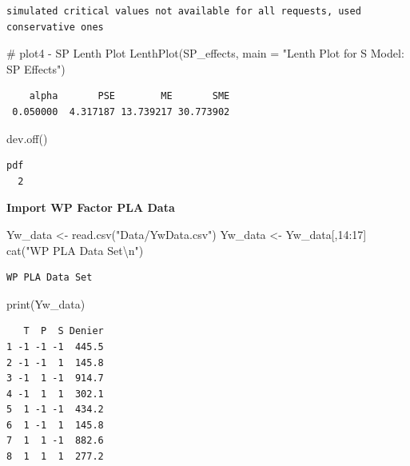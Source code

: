 \documentclass[
  letterpaper,
  DIV=11,
  numbers=noendperiod]{scrartcl}
\newenvironment{Shaded}{\begin{snugshade}}{\end{snugshade}}
\newcommand{\AttributeTok}[1]{\textcolor[rgb]{0.40,0.45,0.13}{#1}}
\newcommand{\CommentTok}[1]{\textcolor[rgb]{0.37,0.37,0.37}{#1}}
\newcommand{\DecValTok}[1]{\textcolor[rgb]{0.68,0.00,0.00}{#1}}
\newcommand{\FunctionTok}[1]{\textcolor[rgb]{0.28,0.35,0.67}{#1}}
\newcommand{\NormalTok}[1]{\textcolor[rgb]{0.00,0.23,0.31}{#1}}
\newcommand{\OtherTok}[1]{\textcolor[rgb]{0.00,0.23,0.31}{#1}}
\newcommand{\SpecialCharTok}[1]{\textcolor[rgb]{0.37,0.37,0.37}{#1}}
\newcommand{\StringTok}[1]{\textcolor[rgb]{0.13,0.47,0.30}{#1}}
\begin{document}
\begin{verbatim}
simulated critical values not available for all requests, used conservative ones
\end{verbatim}

\begin{Shaded}
\begin{Highlighting}[]
\CommentTok{\# plot4 {-} SP Lenth Plot}
\FunctionTok{LenthPlot}\NormalTok{(SP\_effects, }\AttributeTok{main =} \StringTok{"Lenth Plot for S Model: SP Effects"}\NormalTok{)}
\end{Highlighting}
\end{Shaded}

\begin{verbatim}
    alpha       PSE        ME       SME 
 0.050000  4.317187 13.739217 30.773902 
\end{verbatim}

\begin{Shaded}
\begin{Highlighting}[]
\FunctionTok{dev.off}\NormalTok{()}
\end{Highlighting}
\end{Shaded}

\begin{verbatim}
pdf 
  2 
\end{verbatim}

\textbf{Import WP Factor PLA Data }

\begin{Shaded}
\begin{Highlighting}[]
\NormalTok{Yw\_data }\OtherTok{\textless{}{-}} \FunctionTok{read.csv}\NormalTok{(}\StringTok{"Data/YwData.csv"}\NormalTok{)}
\NormalTok{Yw\_data }\OtherTok{\textless{}{-}}\NormalTok{ Yw\_data[,}\DecValTok{14}\SpecialCharTok{:}\DecValTok{17}\NormalTok{]}
\FunctionTok{cat}\NormalTok{(}\StringTok{"WP PLA Data Set}\SpecialCharTok{\textbackslash{}n}\StringTok{"}\NormalTok{)}
\end{Highlighting}
\end{Shaded}

\begin{verbatim}
WP PLA Data Set
\end{verbatim}

\begin{Shaded}
\begin{Highlighting}[]
\FunctionTok{print}\NormalTok{(Yw\_data)}
\end{Highlighting}
\end{Shaded}

\begin{verbatim}
   T  P  S Denier
1 -1 -1 -1  445.5
2 -1 -1  1  145.8
3 -1  1 -1  914.7
4 -1  1  1  302.1
5  1 -1 -1  434.2
6  1 -1  1  145.8
7  1  1 -1  882.6
8  1  1  1  277.2
\end{verbatim}
\end{document}
